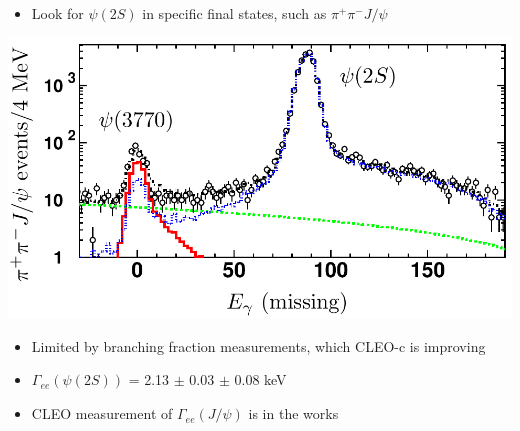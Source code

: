 \documentclass[landscape]{article}
\newenvironment{slide}[1][ ]{\mbox{\bf \boldmath #1 } \vfill}{\vfill \vspace{-1.5 cm} \mbox{ } \pagebreak}
\newenvironment{itemizer}[1]{\begin{itemize}\setlength{\itemsep}{#1}}{\end{itemize}}
\begin{document}
\begin{slide}

\begin{itemize}

  \item Look for $\psi(2S)$ in specific final states, such as $\pi^+\pi^- J/\psi$

\end{itemize}

\vfill

\begin{center}
  \includegraphics[width=0.8\linewidth]{psi_gamee2}
\end{center}

\vfill

\begin{itemizer}{0.5 cm}

  \item Limited by branching fraction measurements, which CLEO-c is improving

  \item $\Gamma_{ee}(\psi(2S))$ = 2.13 $\pm$ 0.03 $\pm$ 0.08 keV

  \item CLEO measurement of $\Gamma_{ee}(J/\psi)$ is in the works

\end{itemizer}

\end{slide}
\end{document}
